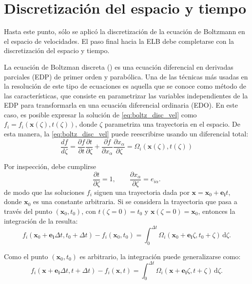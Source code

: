 \section{Discretizaci\'on del espacio y tiempo}  
Hasta este punto, s\'olo se aplic\'o la discretizaci\'on de la ecuaci\'on de Boltzmann en el espacio de velocidades. El paso final hacia la ELB debe completarse con la discretizaci\'on del espacio y tiempo.
\par 
La ecuaci\'on de Boltzman discreta () es una ecuaci\'on diferencial en derivadas parciales (EDP) de primer orden y parab\'olica. Una de las t\'ecnicas m\'as usadas en la resoluci\'on de este tipo de ecuaciones es aquella que se conoce como m\'etodo de las caracter\'isticas, que consiste en parametrizar las variables independientes de la EDP para transformarla en una ecuaci\'on diferencial ordinaria (EDO). En este caso, es posible expresar la soluci\'on de \ref{eq:boltz_disc_vel} como $f_i=f_i(\bm{x}(\zeta),t(\zeta))$, donde $\zeta$ parametriza una trayectoria en el espacio. De esta manera, la \eqref{eq:boltz_disc_vel} puede reescribirse usando un diferencial total:
\begin{equation}
	\dfrac{df}{d\zeta} = \dfrac{\partial f}{\partial t}\dfrac{\partial t}{\partial \zeta} + \dfrac{\partial f}{\partial x_{\alpha}}\dfrac{\partial x_{\alpha}}{\partial \zeta} = \Omega_i(\bm{x}(\zeta),t(\zeta))
	\label{eq:zeta_total}
\end{equation}

Por inspecci\'on, debe cumplirse
\begin{equation}
	\dfrac{\partial t}{\partial \zeta} = 1, \qquad
	\dfrac{\partial x_{\alpha}}{\partial \zeta} = e_{i\alpha}.
\end{equation}
de modo que las soluciones $f_i$ siguen una trayectoria dada por $\bm{x}=\bm{x}_0 + \bm{e_i}t$, donde $\bm{x}_0$ es una constante arbitraria. Si se considera la trayectoria que pasa a trav\'es del punto $(\bm{x}_0,t_0)$, con $t(\zeta=0)=t_0$ y $\bm{x}(\zeta=0)=\bm{x}_0$, entonces la integraci\'on de la  resulta:
\begin{equation}
	f_i(\bm{x}_0+\bm{e_i}\Delta t,t_0+\Delta t)-f_i(\bm{x}_0,t_0)=\int_0^{\Delta t}\Omega_i(\bm{x}_0+\bm{e_i}\zeta,t_0+\zeta) \, \mbox{d}\zeta.
\end{equation}

Como el punto $(\bm{x}_0,t_0)$ es arbitrario, la integraci\'on puede generalizarse como:
\begin{equation}
	f_i(\bm{x}+\bm{e_i}\Delta t,t+\Delta t)-f_i(\bm{x},t)=\int_0^{\Delta t}\Omega_i(\bm{x}+\bm{e_i}\zeta,t+\zeta) \, \mbox{d}\zeta.
	\label{eq:elb_integral}
\end{equation}


